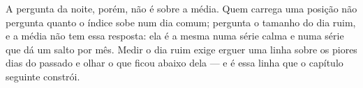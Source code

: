 A pergunta da noite, porém, não é sobre a média. Quem carrega uma posição não pergunta quanto o
índice sobe num dia comum; pergunta o tamanho do dia ruim, e a média não tem essa resposta: ela
é a mesma numa série calma e numa série que dá um salto por mês. Medir o dia ruim exige erguer
uma linha sobre os piores dias do passado e olhar o que ficou abaixo dela --- e é essa linha que
o capítulo seguinte constrói.
